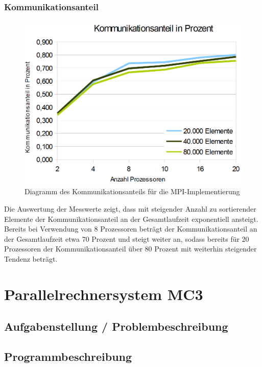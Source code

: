 \documentclass[a4paper,12pt]{scrartcl}
\begin{document}
\subsubsection{Kommunikationsanteil}
\begin{figure}[htb]
  \begin{center}
    \includegraphics[width=1\hsize]{../Kommunikationsanteil.PNG}
  \end{center}
  \caption{\label{mpikommoverhead}
    Diagramm des Kommunikationsanteils f\"ur die MPI-Implementierung}
\end{figure}
Die Auswertung der Messwerte zeigt, dass mit steigender Anzahl zu sortierender Elemente der Kommunikationsanteil an der Gesamtlaufzeit exponentiell ansteigt.
Bereits bei Verwendung von 8 Prozessoren betr\"agt der Kommunikationsanteil an der Gesamtlaufzeit etwa 70 Prozent und steigt weiter an, sodass bereits
f\"ur 20 Prozessoren der Kommunikationsanteil \"uber 80 Prozent mit weiterhin steigender Tendenz betr\"agt.

\section{Parallelrechnersystem MC3}

\subsection{Aufgabenstellung / Problembeschreibung}
\subsection{Programmbeschreibung}
\end{document}
